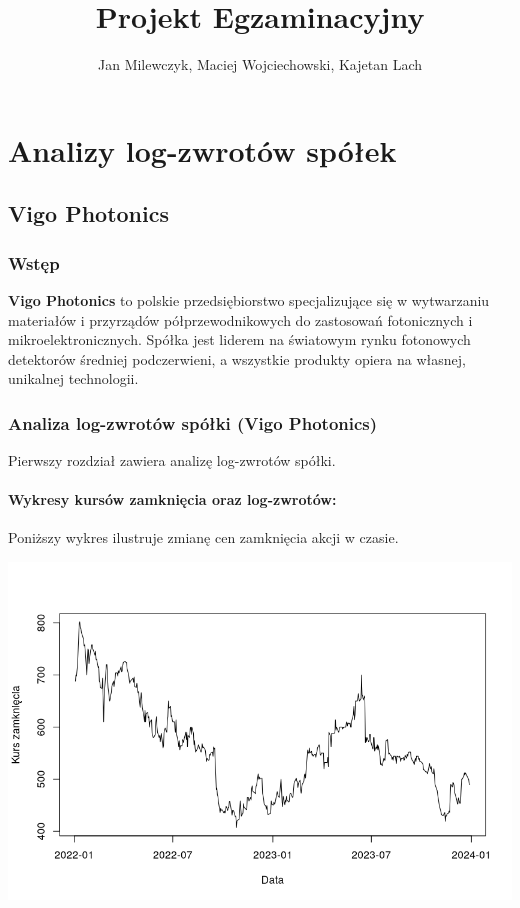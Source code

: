 \documentclass[a4paper,11pt]{article}
\title{Projekt Egzaminacyjny}
\author{Jan Milewczyk, Maciej Wojciechowski, Kajetan Lach}
\begin{document}
\maketitle

\section{Analizy log-zwrotów spółek}

\subsection{Vigo Photonics}

\subsubsection{Wstęp}
\textbf{Vigo Photonics} to polskie przedsiębiorstwo specjalizujące się w wytwarzaniu materiałów i przyrządów półprzewodnikowych do zastosowań fotonicznych i mikroelektronicznych. Spółka jest liderem na światowym rynku fotonowych detektorów średniej podczerwieni, a wszystkie produkty opiera na własnej, unikalnej technologii.

\subsubsection {Analiza log-zwrotów spółki (Vigo Photonics)}
Pierwszy rozdział zawiera analizę log-zwrotów spółki.


\newpage\paragraph{Wykresy kursów zamknięcia oraz log-zwrotów:}
Poniższy wykres ilustruje zmianę cen zamknięcia akcji w czasie.

\centerline{\includegraphics[width=1\textwidth]{./Kajtek/img/kursy_zamkniecia_plot.png}}
\end{document}
